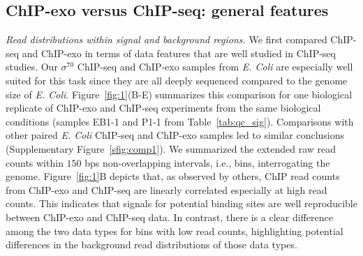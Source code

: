 \documentclass{bmcart}
\newcommand{\SK}[1]{\textcolor{red}{SK: #1}}
\newcommand{\RW}[1]{\textcolor{blue}{RW: #1}}
\newcommand{\sig}{\sigma^{70}}
\begin{document}

\subsection*{ChIP-exo versus ChIP-seq: general features}

\textit{Read distributions within signal and background regions.} We first compared ChIP-seq and ChIP-exo in terms of data features that
are well studied in ChIP-seq studies. Our $\sig$ ChIP-seq and ChIP-exo samples from \textit{E. Coli} are especially well suited for this task since they are all deeply sequenced compared to the genome size of \textit{E. Coli}.  Figure~\ref{fig:1}(B-E) summarizes this comparison for one biological replicate of ChIP-exo and ChIP-seq experiments from the same biological conditions (samples EB1-1 and P1-1 from Table~\ref{tab:qc_sig}). Comparisons with other paired \textit{E. Coli} ChIP-seq and ChIP-exo samples led to similar conclusions (Supplementary Figure~\ref{sfig:comp1}). We summarized the extended raw read counts within $150$ bps non-overlapping intervals, i.e., bins, interrogating the genome. Figure~\ref{fig:1}B depicts that, as observed by others, ChIP read counts from ChIP-exo and ChIP-seq are linearly correlated especially at high read counts. This indicates that signals for potential binding sites are well reproducible between ChIP-exo and ChIP-seq data.  In contrast, there is a clear difference among the two data types for bins with low read counts, highlighting potential differences in the background read distributions of those data types.

\end{document}
